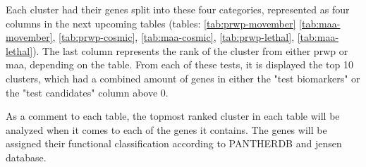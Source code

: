 Each cluster had their genes split into these four categories, represented as
four columns in the next upcoming tables (tables: \ref{tab:prwp-movember}
\ref{tab:maa-movember}, \ref{tab:prwp-cosmic}, \ref{tab:maa-cosmic},
\ref{tab:prwp-lethal}, \ref{tab:maa-lethal}). The last column represents the
rank of the cluster from either \gls{prwp} or \gls{maa}, depending on the table.
From each of these tests, it is displayed the top 10 clusters, which had
a combined amount of genes in either the "test biomarkers" or the "test
candidates" column above 0.

As a comment to each table, the topmost ranked cluster in each table will be
analyzed when it comes to each of the genes it contains. The genes will be
assigned their functional classification according to PANTHERDB and \gls{jensen}
database\cite{pantherdb,panther,disgenet}.

